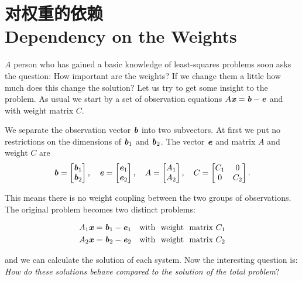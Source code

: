 \section[对权重的依赖]{对权重的依赖\\Dependency on the Weights}
\begin{flushleft}
	$A$ person who has gained a basic knowledge of least-squares problems soon asks the question: How important are the weights? If we change them a little how much does this change the solution? Let us try to get some insight to the problem. As usual we start by a set of observation equations $ A\textbf{\textit{x}}=\textbf{\textit{b}}-\textbf{\textit{e}} $ and with weight matrix $C$.
\end{flushleft}

We separate the observation vector $\textbf{\textit{b}}$ into two subvectors. At first we put no restrictions on the dimensions of $\textbf{\textit{b}}_{1}$ and $\textbf{\textit{b}}_{2}$. The vector $\textbf{\textit{e}}$ and matrix $A$ and weight $C$ are
\begin{align*}
\textbf{\textit{b}}=
\begin{bmatrix}
\textbf{\textit{b}}_{1} \\	
\textbf{\textit{b}}_{2}
\end{bmatrix},
\quad
\textbf{\textit{e}}=
\begin{bmatrix}
\textbf{\textit{e}}_{1} \\	
\textbf{\textit{e}}_{2}
\end{bmatrix},
\quad
A=
\begin{bmatrix}
A_{1} \\	
A_{2}
\end{bmatrix},
\quad
C=
\begin{bmatrix}
C_{1} & 0\\	
  0   & C_{2}
\end{bmatrix}.
\end{align*}
\begin{flushleft}
	This means there is no weight coupling between the two groups of observations. The original problem becomes two distinct problems:
\end{flushleft}
\begin{align*}
A_{1}\textbf{\textit{x}}&=\textbf{\textit{b}}_{1}-\textbf{\textit{e}}_{1}  &\text{with \ weight \ matrix} \ C_{1}                      \\
A_{2}\textbf{\textit{x}}&=\textbf{\textit{b}}_{2}-\textbf{\textit{e}}_{2}  &\text{with \ weight \ matrix} \ C_{2}    
\end{align*}
\begin{flushleft}
	and we can calculate the solution of each system. Now the interesting question is: \textit{How do these solutions behave compared to the solution of the total problem}?
\end{flushleft}

